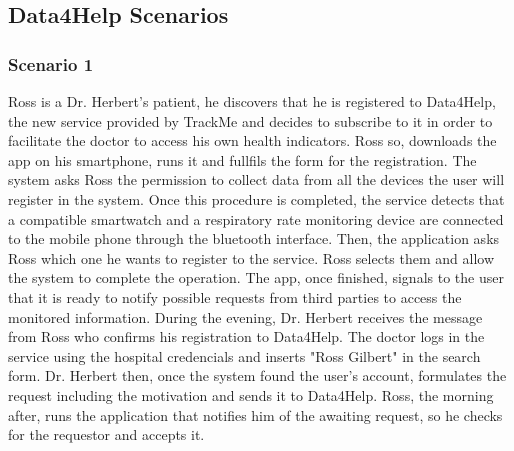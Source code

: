 \paragraph{}



{\color{Blue}\subsection{Data4Help Scenarios}}
{\color{Blue}\subsubsection{Scenario 1}}

Ross is a Dr. Herbert's patient, he discovers that he is registered to Data4Help, the new service provided by TrackMe and decides to subscribe to it in order to facilitate the doctor to access his own health indicators. Ross so, downloads the app on his smartphone, runs it and fullfils the form for the registration. The system asks Ross the permission to collect data from all the devices the user will register in the system. Once this procedure is completed, the service detects that a compatible smartwatch and a respiratory rate monitoring device are connected to the mobile phone through the bluetooth interface. Then, the application asks Ross which one he wants to register to the service. Ross selects them and allow the system to complete the operation. The app, once finished, signals to the user that it is ready to notify possible requests from third parties to access the monitored information.
During the evening, Dr. Herbert receives the message from Ross who confirms his registration to Data4Help. The doctor logs in the service using the hospital credencials and inserts "Ross Gilbert" in the search form. Dr. Herbert then, once the system found the user's account, formulates the request including the motivation and sends it to Data4Help. Ross, the morning after, runs the application that notifies him of the awaiting request, so he checks for the requestor and accepts it.  
\paragraph{}

